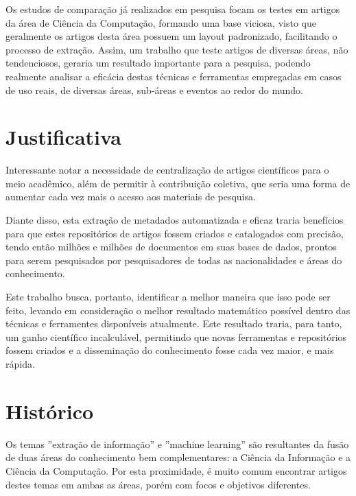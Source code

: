\begin{textnew}
Os estudos de comparação já realizados em pesquisa focam os testes em artigos da área de Ciência da Computação, formando uma base viciosa, visto que geralmente os artigos desta área possuem um layout padronizado, facilitando o processo de extração. Assim, um trabalho que teste artigos de diversas áreas, não tendenciosos, geraria um resultado importante para a pesquisa, podendo realmente analisar a eficácia destas técnicas e ferramentas empregadas em casos de uso reais, de diversas áreas, sub-áreas e eventos ao redor do mundo.
\end{textnew}

\section{Justificativa}
\label{sec:justification}

Interessante notar a necessidade de centralização de artigos científicos para o meio acadêmico, além de permitir à contribuição coletiva, que seria uma forma de aumentar cada vez mais o acesso aos materiais de pesquisa. 

Diante disso, esta extração de metadados automatizada e eficaz traria benefícios para que estes repositórios de artigos fossem criados e catalogados com precisão, tendo então milhões e milhões de documentos em suas bases de dados, prontos para serem pesquisados por pesquisadores de todas as nacionalidades e áreas do conhecimento.

Este trabalho busca, portanto, identificar a melhor maneira que isso pode ser feito, levando em consideração o melhor resultado matemático possível dentro das técnicas e ferramentes disponíveis atualmente. Este resultado traria, para tanto, um ganho científico incalculável, permitindo que novas ferramentas e repositórios fossem criados e a disseminação do conhecimento fosse cada vez maior, e mais rápida.

\section{Histórico}
\label{sec:history}

Os temas ''extração de informação'' e ''machine learning'' são resultantes da fusão de duas áreas do conhecimento bem complementares: a Ciência da Informação e a Ciência da Computação. Por esta proximidade, é muito comum encontrar artigos destes temas em ambas as áreas, porém com focos e objetivos diferentes.

